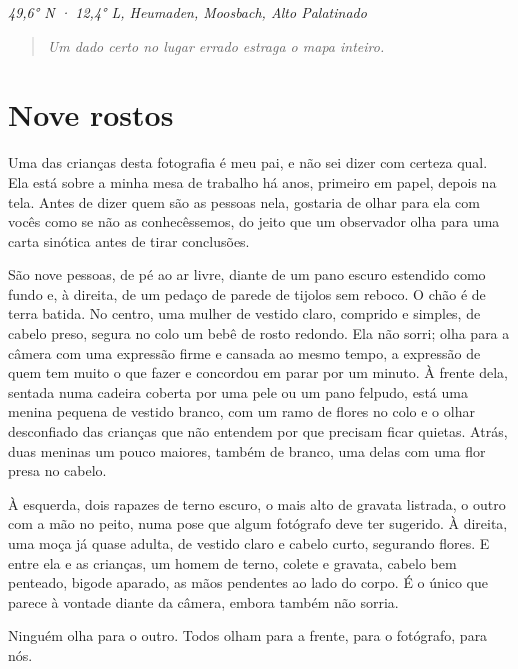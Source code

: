 \documentclass[
  brazilian,
  11pt,
  openany]{book}
\begin{document}
\emph{49,6° N · 12,4° L, Heumaden, Moosbach, Alto Palatinado}

\begin{quote}
\emph{Um dado certo no lugar errado estraga o mapa inteiro.}
\end{quote}

\section{Nove rostos}\label{nove-rostos}

Uma das crianças desta fotografia é meu pai, e não sei dizer com certeza
qual. Ela está sobre a minha mesa de trabalho há anos, primeiro em
papel, depois na tela. Antes de dizer quem são as pessoas nela, gostaria
de olhar para ela com vocês como se não as conhecêssemos, do jeito que
um observador olha para uma carta sinótica antes de tirar conclusões.

São nove pessoas, de pé ao ar livre, diante de um pano escuro estendido
como fundo e, à direita, de um pedaço de parede de tijolos sem reboco. O
chão é de terra batida. No centro, uma mulher de vestido claro, comprido
e simples, de cabelo preso, segura no colo um bebê de rosto redondo. Ela
não sorri; olha para a câmera com uma expressão firme e cansada ao mesmo
tempo, a expressão de quem tem muito o que fazer e concordou em parar
por um minuto. À frente dela, sentada numa cadeira coberta por uma pele
ou um pano felpudo, está uma menina pequena de vestido branco, com um
ramo de flores no colo e o olhar desconfiado das crianças que não
entendem por que precisam ficar quietas. Atrás, duas meninas um pouco
maiores, também de branco, uma delas com uma flor presa no cabelo.

À esquerda, dois rapazes de terno escuro, o mais alto de gravata
listrada, o outro com a mão no peito, numa pose que algum fotógrafo deve
ter sugerido. À direita, uma moça já quase adulta, de vestido claro e
cabelo curto, segurando flores. E entre ela e as crianças, um homem de
terno, colete e gravata, cabelo bem penteado, bigode aparado, as mãos
pendentes ao lado do corpo. É o único que parece à vontade diante da
câmera, embora também não sorria.

Ninguém olha para o outro. Todos olham para a frente, para o fotógrafo,
para nós.
\end{document}
